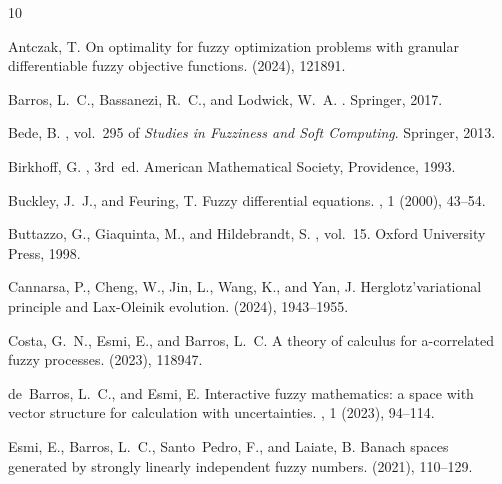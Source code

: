 \documentclass[12pt,a4paper]{article}
\begin{document}
\begin{thebibliography}{10}

{\sc Antczak, T.}
\newblock On optimality for fuzzy optimization problems with granular differentiable fuzzy objective functions.
 (2024), 121891.

{\sc Barros, L.~C., Bassanezi, R.~C., and Lodwick, W.~A.}
.
\newblock Springer, 2017.

{\sc Bede, B.}
, vol.~295 of {\em Studies in Fuzziness and Soft Computing}.
\newblock Springer, 2013.

{\sc Birkhoff, G.}
, 3rd~ed.
\newblock American Mathematical Society, Providence, 1993.

{\sc Buckley, J.~J., and Feuring, T.}
\newblock Fuzzy differential equations.
, 1 (2000), 43--54.

{\sc Buttazzo, G., Giaquinta, M., and Hildebrandt, S.}
, vol.~15.
\newblock Oxford University Press, 1998.

{\sc Cannarsa, P., Cheng, W., Jin, L., Wang, K., and Yan, J.}
\newblock Herglotz'variational principle and {L}ax-{O}leinik evolution.
 (2024), 1943--1955.

{\sc Costa, G.~N., Esmi, E., and Barros, L.~C.}
\newblock A theory of calculus for a-correlated fuzzy processes.
 (2023), 118947.

{\sc de~Barros, L.~C., and Esmi, E.}
\newblock Interactive fuzzy mathematics: a space with vector structure for calculation with uncertainties.
, 1 (2023), 94--114.

{\sc Esmi, E., Barros, L.~C., Santo~Pedro, F., and Laiate, B.}
\newblock Banach spaces generated by strongly linearly independent fuzzy numbers.
 (2021), 110--129.


\end{thebibliography}
\end{document}
